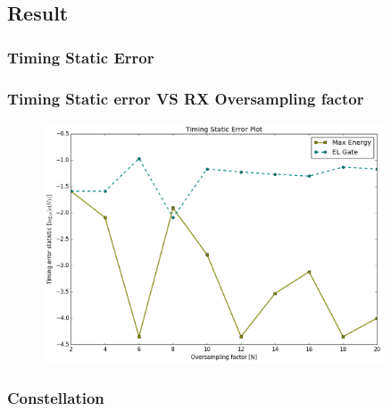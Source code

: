 \documentclass[11pt]{beamer}
\begin{document}
\subsection{Result}
\subsubsection{Timing Static Error}
\begin{frame}
\frametitle{Timing Static error VS RX Oversampling factor}
\begin{figure}
\includegraphics[width=0.9\textwidth]{img/Timing-Static-Error.png}
\end{figure}

\end{frame}

\subsubsection{Constellation}
\end{document}
